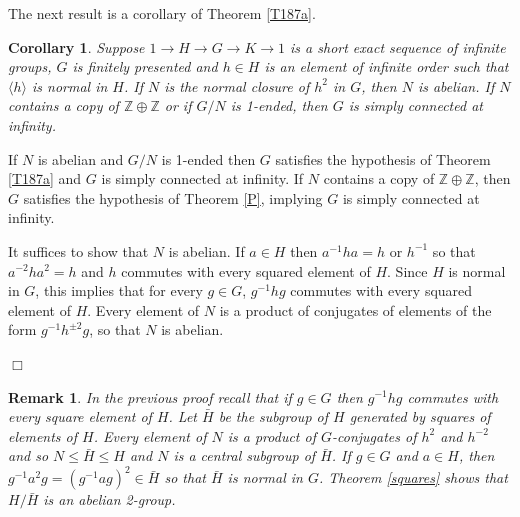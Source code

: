 \documentclass[12pt]{article}
\newtheorem{corollary}[theorem]{Corollary}
\newtheorem{remark}[theorem]{Remark}
\newenvironment{proof}{\addvspace{12pt}\noindent{\bf Proof:}}{
$\Box$\par\addvspace{12pt}}
\begin{document}
The next result is a corollary of Theorem \ref{T187a}. 

\begin{corollary} \label{C187a1} 
Suppose $1\to H\to G\to K\to 1$ is a short exact sequence of infinite groups, $G$ is finitely presented and $h\in H$ is an element of infinite order such that $\langle h\rangle$ is normal in $H$. If $N$ is the normal closure of $h^2$ in $G$, then $N$ is abelian. If $N$ contains a copy of $\mathbb Z\oplus \mathbb Z$ or if $G/N$ is 1-ended, then $G$ is simply connected at infinity. \end{corollary} 
\begin{proof} If $N$ is abelian and $G/N$ is 1-ended then $G$ satisfies the hypothesis of Theorem \ref{T187a} and $G$ is simply connected at infinity. If $N$ contains a copy of $\mathbb Z\oplus \mathbb Z$, then $G$ satisfies the hypothesis of Theorem \ref{P}, implying $G$ is simply connected at infinity. 

It suffices to show that $N$ is abelian.  If $a\in H$ then $a^{-1}ha=h$ or $h^{-1}$ so that $a^{-2}ha^2=h$ and $h$ commutes with every squared element of $H$. Since $H$ is normal in $G$, this implies that for every $g\in G$, $g^{-1}hg$ commutes with every squared element of $H$. Every element of $N$ is a product of conjugates of elements of the form $g^{-1}h^{\pm 2}g$, so that $N$ is abelian. 
\end{proof}

\begin{remark}\label{R187a}
In the previous proof recall that if $g\in G$ then $g^{-1}hg$ commutes with every square element of $H$. Let $\bar H$ be the subgroup of $H$ generated by squares of elements of $H$. Every element of $N$ is a product of $G$-conjugates of $h^2$ and $h^{-2}$ and so $N\leq \bar H\leq H$ and $N$ is a central subgroup of $\bar H$. If $g\in G$ and $a\in H$, then $g^{-1}a^2g=(g^{-1}ag)^2\in \bar H$ so that $\bar H$ is normal in $G$. 
Theorem \ref{squares} shows that $H/\bar H$ is an abelian 2-group.
\end{remark}

\end{document}
